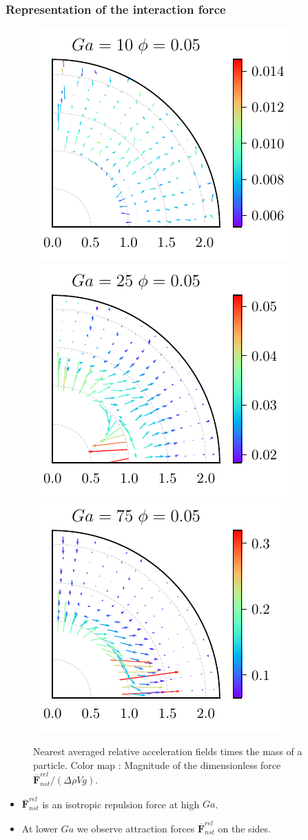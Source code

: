 \documentclass{sintefbeamer}
\newcommand{\nstrelavg}[1]{\overline{#1}_{nst}^{rel}}
\begin{document}
\begin{frame}
  \frametitle{Representation of the interaction force}

  \begin{figure}
    
    \includegraphics[height=0.25\textwidth]{image/HOMOGENEOUS/fDrop/F_mu_r_0_1_Ga_10_PHI_0_05.pdf}
    \includegraphics[height=0.25\textwidth]{image/HOMOGENEOUS/fDrop/F_mu_r_0_1_Ga_25_PHI_0_05.pdf}
    \includegraphics[height=0.25\textwidth]{image/HOMOGENEOUS/fDrop/F_mu_r_0_1_Ga_75_PHI_0_05.pdf}
    
    \caption{Nearest averaged relative acceleration fields times the mass of a particle. 
    Color map : Magnitude of the dimensionless force  $\nstrelavg{\textbf{F}} / (\Delta \rho V g)$.}
  \end{figure}

  
\begin{itemize}
  \item $\nstrelavg{\textbf{F}}$ is an isotropic repulsion force at high $Ga$. 
  \item At lower $Ga$ we observe attraction forces $\nstrelavg{\textbf{F}}$ on the sides.
\end{itemize}
\end{frame}
\end{document}
